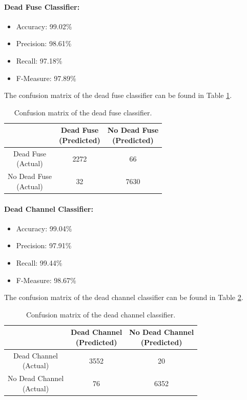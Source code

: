 \paragraph{Dead Fuse Classifier:}
\begin{itemize}
  \item Accuracy: 99.02\%
  \item Precision: 98.61\%
  \item Recall: 97.18\%
  \item F-Measure: 97.89\%
\end{itemize}
The confusion matrix of the dead fuse classifier can be found in Table
\ref{tbl:confusion-fuse}.
\begin{table}[h]
  \centering
  \renewcommand\theadfont{\bfseries}
  \begin{tabular}{|c|c|c|}
    \hline
    & \thead{Dead Fuse\\(Predicted)} & \thead{No Dead Fuse\\(Predicted)} \\
    \hline
    \thead{Dead Fuse\\(Actual)} & 2272 & 66\\
    \hline
    \thead{No Dead Fuse\\(Actual)} & 32 & 7630\\
    \hline
  \end{tabular}
  \caption{Confusion matrix of the dead fuse classifier.}
  \label{tbl:confusion-fuse}
\end{table}

\paragraph{Dead Channel Classifier:}
\begin{itemize}
  \item Accuracy: 99.04\%
  \item Precision: 97.91\%
  \item Recall: 99.44\%
  \item F-Measure: 98.67\%
\end{itemize}
The confusion matrix of the dead channel classifier can be found in Table
\ref{tbl:confusion-channel}.
\begin{table}[h]
  \centering
  \renewcommand\theadfont{\bfseries}
  \begin{tabular}{|c|c|c|}
    \hline
    & \thead{Dead Channel\\(Predicted)} & \thead{No Dead Channel\\(Predicted)} \\
    \hline
    \thead{Dead Channel\\(Actual)} & 3552 & 20\\
    \hline
    \thead{No Dead Channel\\(Actual)} & 76 & 6352\\
    \hline
  \end{tabular}
  \caption{Confusion matrix of the dead channel classifier.}
  \label{tbl:confusion-channel}
\end{table}

